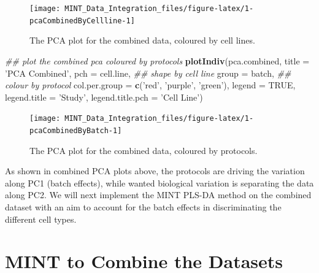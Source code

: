 \documentclass[]{book}
\newenvironment{Shaded}{\begin{snugshade}}{\end{snugshade}}
\newcommand{\CommentTok}[1]{\textcolor[rgb]{0.56,0.35,0.01}{\textit{#1}}}
\newcommand{\DataTypeTok}[1]{\textcolor[rgb]{0.13,0.29,0.53}{#1}}
\newcommand{\KeywordTok}[1]{\textcolor[rgb]{0.13,0.29,0.53}{\textbf{#1}}}
\newcommand{\NormalTok}[1]{#1}
\newcommand{\OtherTok}[1]{\textcolor[rgb]{0.56,0.35,0.01}{#1}}
\newcommand{\StringTok}[1]{\textcolor[rgb]{0.31,0.60,0.02}{#1}}
\theoremstyle{definition}
\theoremstyle{definition}
\theoremstyle{definition}
\theoremstyle{remark}
\begin{document}
\begin{figure}[ht]

{\centering \texttt{[image: MINT\_Data\_Integration\_files/figure-latex/1-pcaCombinedByCellline-1]} 

}

\caption{The PCA plot for the combined data, coloured by cell lines.}\label{fig:1-pcaCombinedByCellline}
\end{figure}

\begin{Shaded}
\begin{Highlighting}[]
\CommentTok{## plot the combined pca coloured by protocols}
\KeywordTok{plotIndiv}\NormalTok{(pca.combined, }\DataTypeTok{title =} \StringTok{'PCA Combined'}\NormalTok{,}
          \DataTypeTok{pch =}\NormalTok{ cell.line, }\CommentTok{## shape by cell line}
          \DataTypeTok{group =}\NormalTok{ batch, }\CommentTok{## colour by protocol}
          \DataTypeTok{col.per.group =} \KeywordTok{c}\NormalTok{(}\StringTok{'red'}\NormalTok{, }\StringTok{'purple'}\NormalTok{, }\StringTok{'green'}\NormalTok{),}
          \DataTypeTok{legend =} \OtherTok{TRUE}\NormalTok{, }\DataTypeTok{legend.title =} \StringTok{'Study'}\NormalTok{,}
          \DataTypeTok{legend.title.pch =} \StringTok{'Cell Line'}\NormalTok{)}
\end{Highlighting}
\end{Shaded}

\begin{figure}[ht]

{\centering \texttt{[image: MINT\_Data\_Integration\_files/figure-latex/1-pcaCombinedByBatch-1]} 

}

\caption{The PCA plot for the combined data, coloured by protocols.}\label{fig:1-pcaCombinedByBatch}
\end{figure}

As shown in combined PCA plots above, the protocols are driving the
variation along PC1 (batch effects), while wanted biological variation
is separating the data along PC2. We will next implement the MINT PLS-DA
method on the combined dataset with an aim to account for the batch
effects in discriminating the different cell types.

\hypertarget{mint-to-combine-the-datasets}{%
\section{MINT to Combine the
Datasets}\label{mint-to-combine-the-datasets}}
\end{document}
